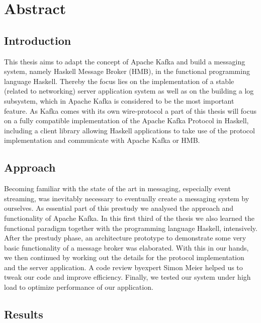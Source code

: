\chapter{Abstract}

\section{Introduction}

This thesis aims to adapt the concept of Apache Kafka and build a messaging
system, namely Haskell Message Broker (HMB), in the functional programming
language Haskell. Thereby the focus lies on the implementation of a stable
(related to networking) server application system as well as on the building a
log subsystem, which in Apache Kafka is considered to be the most important
feature. As Kafka comes with its own wire-protocol a part of this thesis will
focus on a fully compatible implementation of the Apache Kafka Protocol in
Haskell, including a client library allowing Haskell applications to take use of
the protocol implementation and communicate with Apache Kafka or HMB.

\section{Approach}

Becoming familiar with the state of the art in messaging, especially event
streaming, was inevitably necessary to eventually create a messaging system by
ourselves. As essential part of this prestudy we analysed the approach and
functionality of Apache Kafka. In this first third of the thesis we also learned
the functional paradigm together with the programming language Haskell,
intensively. After the prestudy phase, an architecture prototype to demonstrate
some very basic functionality of a message broker was elaborated. With this in
our hands, we then continued by working out the details for the protocol
implementation and the server application. A code review byexpert Simon Meier
helped us to tweak our code and improve efficiency. Finally, we tested our
system under high load to optimize performance of our application.

\section{Results}

